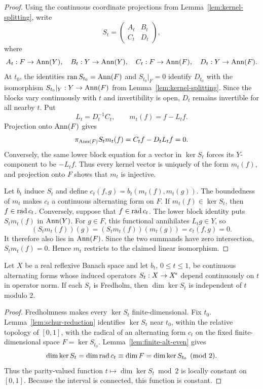 \begin{proof}
Using the continuous coordinate projections from Lemma~\ref{lem:kernel-splitting}, write
\[
  S_t=\begin{pmatrix}A_t&B_t\\ C_t&D_t\end{pmatrix},
\]
where
\[
  A_t:F\to\operatorname{Ann}(Y),\quad B_t:Y\to\operatorname{Ann}(Y),\quad
  C_t:F\to\operatorname{Ann}(F),\quad D_t:Y\to\operatorname{Ann}(F).
\]
At $t_0$, the identities $\operatorname{ran} S_{t_0}=\operatorname{Ann}(F)$ and $S_{t_0}|_F=0$ identify $D_{t_0}$ with the
isomorphism $S_{t_0}|_Y:Y\to\operatorname{Ann}(F)$ from Lemma~\ref{lem:kernel-splitting}.  Since the blocks vary
continuously with $t$ and invertibility is open, $D_t$ remains invertible for all nearby $t$.
Put
\[
  L_t=D_t^{-1}C_t,\qquad m_t(f)=f-L_tf.
\]
Projection onto $\operatorname{Ann}(F)$ gives
\[
  \pi_{\operatorname{Ann}(F)}S_tm_t(f)=C_tf-D_tL_tf=0.
\]
Conversely, the same lower block equation for a vector in $\ker S_t$ forces its $Y$-component to
be $-L_tf$.  Thus every kernel vector is uniquely of the form $m_t(f)$, and projection onto $F$
shows that $m_t$ is injective.

Let $b_t$ induce $S_t$ and define $c_t(f,g)=b_t(m_t(f),m_t(g))$.  The boundedness of $m_t$ makes
$c_t$ a continuous alternating form on $F$.  If $m_t(f)\in\ker S_t$, then $f\in\operatorname{rad} c_t$.
Conversely, suppose that $f\in\operatorname{rad} c_t$.  The lower block identity puts $S_tm_t(f)$ in
$\operatorname{Ann}(Y)$.  For $g\in F$, this functional annihilates $L_tg\in Y$, so
\[
  (S_tm_t(f))(g)=(S_tm_t(f))(m_t(g))=c_t(f,g)=0.
\]
It therefore also lies in $\operatorname{Ann}(F)$.  Since the two summands have zero intersection,
$S_tm_t(f)=0$.  Hence $m_t$ restricts to the claimed linear isomorphism.
\end{proof}

\begin{theorem}\label{thm:mod2-path}
Let $X$ be a real reflexive Banach space and let $b_t$, $0\leq t\leq1$, be continuous alternating
forms whose induced operators $S_t:X\to{X}^{\!*}$ depend continuously on $t$ in operator
norm.  If each $S_t$ is Fredholm, then $\dim\ker S_t$ is independent of $t$ modulo $2$.
\leanok
\end{theorem}

\begin{proof}
Fredholmness makes every $\ker S_t$ finite-dimensional.  Fix $t_0$.
Lemma~\ref{lem:schur-reduction} identifies $\ker S_t$ near $t_0$, within the relative topology of
$[0,1]$, with the radical of an alternating form $c_t$ on the fixed finite-dimensional space
$F=\ker S_{t_0}$.  Lemma~\ref{lem:finite-alt-even} gives
\[
  \dim\ker S_t=\dim\operatorname{rad} c_t\equiv\dim F=\dim\ker S_{t_0}\pmod2.
\]
Thus the parity-valued function $t\mapsto\dim\ker S_t\bmod2$ is locally constant on $[0,1]$.
Because the interval is connected, this function is constant.
\end{proof}
